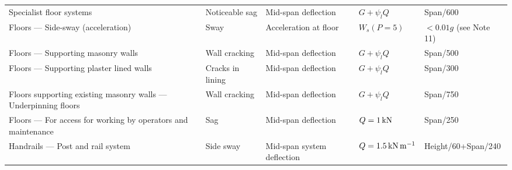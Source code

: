 \begin{table}
\begin{tabular}{lllll}
	Specialist floor systems                                         & Noticeable sag                        & Mid-span deflection               & $G+\psi_lQ$                 & Span/600                                      \\
	Floors --- Side-sway (acceleration)                              & Sway                                  & Acceleration at floor             & $W_s(P=5)$                  & $<0.01g$ (see Note 11)                        \\
	Floors --- Supporting masonry walls                              & Wall cracking                         & Mid-span deflection               & $G+\psi_lQ$                 & Span/500                                      \\
	Floors --- Supporting plaster lined walls                        & Cracks in lining                      & Mid-span deflection               & $G+\psi_lQ$                 & Span/300                                      \\
	Floors supporting existing masonry walls --- Underpinning floors & Wall cracking                         & Mid-span deflection               & $G+\psi_lQ$                 & Span/750                                      \\
	Floors --- For access for working by operators and maintenance   & Sag                                   & Mid-span deflection               & $Q=\SI{1}{\kilo\newton}$             & Span/250                                      \\
	Handrails --- Post and rail system                               & Side sway                             & Mid-span system deflection        & $Q=\SI{1.5}{\kilo\newton\per\meter}$ & Height/60+Span/240                            \\ \bottomrule
\end{tabular}
\end{table}

